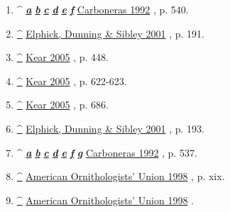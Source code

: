 \documentclass[11pt,a4paper]{article}
\begin{document}
\begin{enumerate}
\item \textasciicircum{} \href{\#cite\_ref-FOOTNOTECarboneras1992540\_9-0}{\textit{\textbf{a}}} \href{\#cite\_ref-FOOTNOTECarboneras1992540\_9-1}{\textit{\textbf{b}}} \href{\#cite\_ref-FOOTNOTECarboneras1992540\_9-2}{\textit{\textbf{c}}} \href{\#cite\_ref-FOOTNOTECarboneras1992540\_9-3}{\textit{\textbf{d}}} \href{\#cite\_ref-FOOTNOTECarboneras1992540\_9-4}{\textit{\textbf{e}}} \href{\#cite\_ref-FOOTNOTECarboneras1992540\_9-5}{\textit{\textbf{f}}} \href{\#CITEREFCarboneras1992}{Carboneras 1992} , p. 540.
\item \href{\#cite\_ref-FOOTNOTEElphickDunningSibley2001191\_10-0}{\textbf{\textasciicircum{}}} \href{\#CITEREFElphickDunningSibley2001}{Elphick, Dunning \& Sibley 2001} , p. 191.
\item \href{\#cite\_ref-FOOTNOTEKear2005448\_11-0}{\textbf{\textasciicircum{}}} \href{\#CITEREFKear2005}{Kear 2005} , p. 448.
\item \href{\#cite\_ref-FOOTNOTEKear2005622–623\_12-0}{\textbf{\textasciicircum{}}} \href{\#CITEREFKear2005}{Kear 2005} , p. 622-623.
\item \href{\#cite\_ref-FOOTNOTEKear2005686\_13-0}{\textbf{\textasciicircum{}}} \href{\#CITEREFKear2005}{Kear 2005} , p. 686.
\item \href{\#cite\_ref-FOOTNOTEElphickDunningSibley2001193\_14-0}{\textbf{\textasciicircum{}}} \href{\#CITEREFElphickDunningSibley2001}{Elphick, Dunning \& Sibley 2001} , p. 193.
\item \textasciicircum{} \href{\#cite\_ref-FOOTNOTECarboneras1992537\_15-0}{\textit{\textbf{a}}} \href{\#cite\_ref-FOOTNOTECarboneras1992537\_15-1}{\textit{\textbf{b}}} \href{\#cite\_ref-FOOTNOTECarboneras1992537\_15-2}{\textit{\textbf{c}}} \href{\#cite\_ref-FOOTNOTECarboneras1992537\_15-3}{\textit{\textbf{d}}} \href{\#cite\_ref-FOOTNOTECarboneras1992537\_15-4}{\textit{\textbf{e}}} \href{\#cite\_ref-FOOTNOTECarboneras1992537\_15-5}{\textit{\textbf{f}}} \href{\#cite\_ref-FOOTNOTECarboneras1992537\_15-6}{\textit{\textbf{g}}} \href{\#CITEREFCarboneras1992}{Carboneras 1992} , p. 537.
\item \href{\#cite\_ref-FOOTNOTEAmerican\_Ornithologists'\_Union1998xix\_16-0}{\textbf{\textasciicircum{}}} \href{\#CITEREFAmerican\_Ornithologists'\_Union1998}{American Ornithologists' Union 1998} , p. xix.
\item \href{\#cite\_ref-FOOTNOTEAmerican\_Ornithologists'\_Union1998\_17-0}{\textbf{\textasciicircum{}}} \href{\#CITEREFAmerican\_Ornithologists'\_Union1998}{American Ornithologists' Union 1998} .

\end{enumerate}
\end{document}

